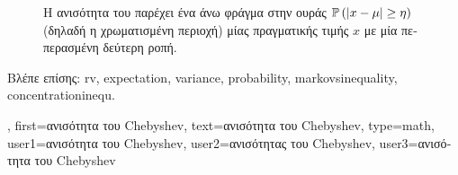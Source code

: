{{\begin{figure}[H]
  		{
		\caption{\foreignlanguage{greek}{Η ανισότητα του}  \foreignlanguage{greek}{παρέχει ένα άνω φράγμα στην}
              		 \foreignlanguage{greek}{ουράς $\mathbb{P}\left(|x-\mu|\ge \eta\right)$ (δηλαδή η χρωματισμένη περιοχή) μίας}
			 \foreignlanguage{greek}{πραγματικής τιμής $x$ με μία πεπερασμένη δεύτερη ροπή}.\label{fig:chebyshev_minimal_dict}} }
		\end{figure}
     		\foreignlanguage{greek}{Βλέπε επίσης:} \gls{rv}, \gls{expectation}, \gls{variance}, \gls{probability}, \gls{markovsinequality}, \gls{concentrationinequ}. },
    	first={\foreignlanguage{greek}{ανισότητα του} Chebyshev},
     	text={\foreignlanguage{greek}{ανισότητα του} Chebyshev},
	type=math,  
	user1={\foreignlanguage{greek}{ανισότητα του} Chebyshev}, %
	user2={\foreignlanguage{greek}{ανισότητας του} Chebyshev}, %
	user3={\foreignlanguage{greek}{ανισότητα του} Chebyshev} %
}

